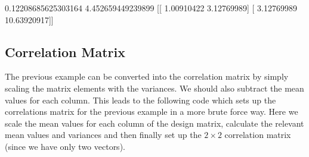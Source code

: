 \documentclass[letterpaper,10pt,english]{sphinxmanual}
\begin{document}
\begin{sphinxVerbatim}[commandchars=\\\{\}]
0.12208685625303164
4.452659449239899
[[ 1.00910422  3.12769989]
 [ 3.12769989 10.63920917]]
\end{sphinxVerbatim}


\subsection{Correlation Matrix}
\label{\detokenize{chapter4:correlation-matrix}}
The previous example can be converted into the correlation matrix by
simply scaling the matrix elements with the variances.  We should also
subtract the mean values for each column. This leads to the following
code which sets up the correlations matrix for the previous example in
a more brute force way. Here we scale the mean values for each column of the design matrix, calculate the relevant mean values and variances and then finally set up the \(2\times 2\) correlation matrix (since we have only two vectors).
\end{document}
